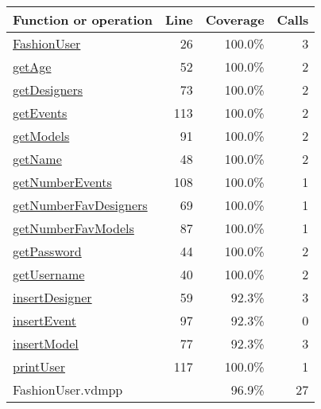 \begin{longtable}{|l|r|r|r|}
\hline
Function or operation & Line & Coverage & Calls \\
\hline
\hline
\hyperref[FashionUser:26]{FashionUser} & 26&100.0\% & 3 \\
\hline
\hyperref[getAge:52]{getAge} & 52&100.0\% & 2 \\
\hline
\hyperref[getDesigners:73]{getDesigners} & 73&100.0\% & 2 \\
\hline
\hyperref[getEvents:113]{getEvents} & 113&100.0\% & 2 \\
\hline
\hyperref[getModels:91]{getModels} & 91&100.0\% & 2 \\
\hline
\hyperref[getName:48]{getName} & 48&100.0\% & 2 \\
\hline
\hyperref[getNumberEvents:108]{getNumberEvents} & 108&100.0\% & 1 \\
\hline
\hyperref[getNumberFavDesigners:69]{getNumberFavDesigners} & 69&100.0\% & 1 \\
\hline
\hyperref[getNumberFavModels:87]{getNumberFavModels} & 87&100.0\% & 1 \\
\hline
\hyperref[getPassword:44]{getPassword} & 44&100.0\% & 2 \\
\hline
\hyperref[getUsername:40]{getUsername} & 40&100.0\% & 2 \\
\hline
\hyperref[insertDesigner:59]{insertDesigner} & 59&92.3\% & 3 \\
\hline
\hyperref[insertEvent:97]{insertEvent} & 97&92.3\% & 0 \\
\hline
\hyperref[insertModel:77]{insertModel} & 77&92.3\% & 3 \\
\hline
\hyperref[printUser:117]{printUser} & 117&100.0\% & 1 \\
\hline
\hline
FashionUser.vdmpp & & 96.9\% & 27 \\
\hline
\end{longtable}

